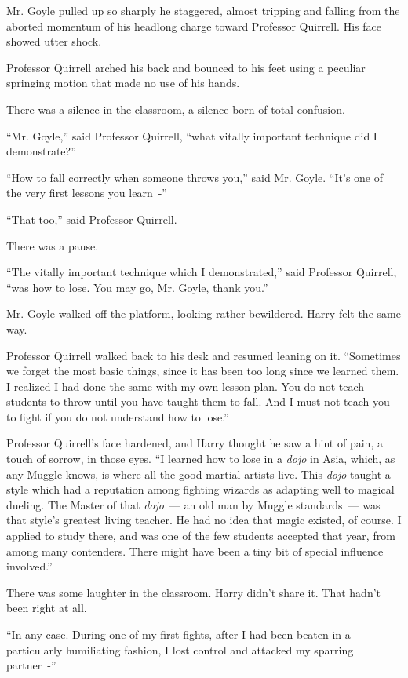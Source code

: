 Mr. Goyle pulled up so sharply he staggered, almost tripping and falling from the aborted momentum of his headlong charge toward Professor Quirrell. His face showed utter shock.

Professor Quirrell arched his back and bounced to his feet using a peculiar springing motion that made no use of his hands.

There was a silence in the classroom, a silence born of total confusion.

``Mr. Goyle,'' said Professor Quirrell, ``what vitally important technique did I demonstrate?''

``How to fall correctly when someone throws you,'' said Mr. Goyle. ``It's one of the very first lessons you learn~-''

``That too,'' said Professor Quirrell.

There was a pause.

``The vitally important technique which I demonstrated,'' said Professor Quirrell, ``was how to lose. You may go, Mr. Goyle, thank you.''

Mr. Goyle walked off the platform, looking rather bewildered. Harry felt the same way.

Professor Quirrell walked back to his desk and resumed leaning on it. ``Sometimes we forget the most basic things, since it has been too long since we learned them. I realized I had done the same with my own lesson plan. You do not teach students to throw until you have taught them to fall. And I must not teach you to fight if you do not understand how to lose.''

Professor Quirrell's face hardened, and Harry thought he saw a hint of pain, a touch of sorrow, in those eyes. ``I learned how to lose in a \emph{dojo} in Asia, which, as any Muggle knows, is where all the good martial artists live. This \emph{dojo} taught a style which had a reputation among fighting wizards as adapting well to magical dueling. The Master of that \emph{dojo}~--- an old man by Muggle standards~--- was that style's greatest living teacher. He had no idea that magic existed, of course. I applied to study there, and was one of the few students accepted that year, from among many contenders. There might have been a tiny bit of special influence involved.''

There was some laughter in the classroom. Harry didn't share it. That hadn't been right at all.

``In any case. During one of my first fights, after I had been beaten in a particularly humiliating fashion, I lost control and attacked my sparring partner~-''

